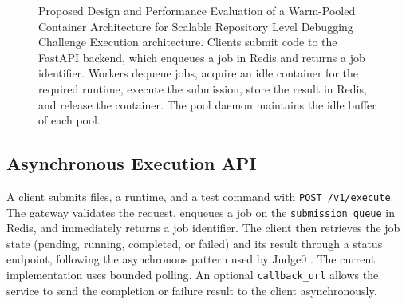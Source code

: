 \documentclass[conference]{IEEEtran}
\begin{document}
\begin{figure}[t]
{%
}
\caption{Proposed Design and Performance Evaluation of a Warm-Pooled Container Architecture for Scalable Repository Level Debugging Challenge Execution architecture. Clients submit code to the FastAPI backend, which enqueues a job in Redis and returns a job identifier. Workers dequeue jobs, acquire an idle container for the required runtime, execute the submission, store the result in Redis, and release the container. The pool daemon maintains the idle buffer of each pool.}
\label{fig:arch}
\end{figure}

\subsection{Asynchronous Execution API}
A client submits files, a runtime, and a test command with \texttt{POST /v1/execute}. The gateway validates the request, enqueues a job on the \texttt{submission\_queue} in Redis, and immediately returns a job identifier. The client then retrieves the job state (pending, running, completed, or failed) and its result through a status endpoint, following the asynchronous pattern used by Judge0 \cite{dosilovic2020}. The current implementation uses bounded polling. An optional \texttt{callback\_url} allows the service to send the completion or failure result to the client asynchronously.
\end{document}
